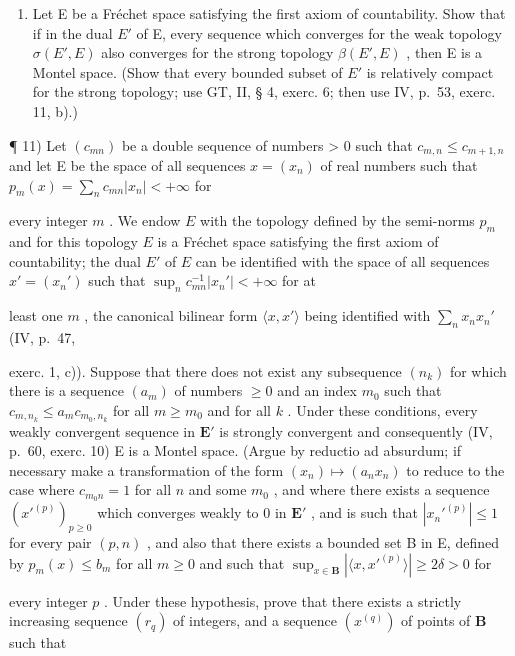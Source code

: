 \begin{enumerate}
\def\labelenumi{\arabic{enumi})}
\setcounter{enumi}{9}
\tightlist
\item
  Let E be a Fréchet space satisfying the first axiom of countability. Show that if in the dual \(E'\) of E, every sequence which converges for the weak topology \(\sigma(E', E)\) also converges for the strong topology \(\beta(E', E)\) , then E is a Montel space. (Show that every bounded subset of \(E'\) is relatively compact for the strong topology; use GT, II, § 4, exerc. 6; then use IV, p.~53, exerc. 11, b).)
\end{enumerate}

¶ 11) Let \((c_{mn})\) be a double sequence of numbers \textgreater{} 0 such that \(c_{m,n} \leqslant c_{m+1,n}\) and let E be the space of all sequences \(x = (x_n)\) of real numbers such that \(p_m(x) = \sum_n c_{mn} |x_n| < +\infty\) for

every integer \(m\) . We endow \(E\) with the topology defined by the semi-norms \(p_m\) and for this topology \(E\) is a Fréchet space satisfying the first axiom of countability; the dual \(E'\) of \(E\) can be identified with the space of all sequences \(x' = (x_n')\) such that \(\sup_{n} c_{mn}^{-1} |x_n'| < +\infty\) for at

least one \(m\) , the canonical bilinear form \(\langle x, x' \rangle\) being identified with \(\sum_{n} x_n x_n'\) (IV, p.~47,

exerc. 1, c)). Suppose that there does not exist any subsequence \((n_k)\) for which there is a sequence \((a_m)\) of numbers \(\geqslant 0\) and an index \(m_0\) such that \(c_{m,n_k} \leqslant a_m c_{m_0,n_k}\) for all \(m \geqslant m_0\) and for all \(k\) . Under these conditions, every weakly convergent sequence in \(\mathbf{E}'\) is strongly convergent and consequently (IV, p.~60, exerc. 10) E is a Montel space. (Argue by reductio ad absurdum; if necessary make a transformation of the form \((x_n) \mapsto (a_n x_n)\) to reduce to the case where \(c_{m_0 n} = 1\) for all \(n\) and some \(m_0\) , and where there exists a sequence \((x'^{(p)})_{p \geqslant 0}\) which converges weakly to 0 in \(\mathbf{E}'\) , and is such that \(|x_n'^{(p)}| \leqslant 1\) for every pair \((p, n)\) , and also that there exists a bounded set B in E, defined by \(p_m(x) \leqslant b_m\) for all \(m \geqslant 0\) and such that \(\sup_{x \in \mathbf{B}} |\langle x, x'^{(p)} \rangle| \geqslant 2\delta > 0\) for

every integer \(p\) . Under these hypothesis, prove that there exists a strictly increasing sequence \((r_q)\) of integers, and a sequence \((x^{(q)})\) of points of \(\mathbf{B}\) such that

